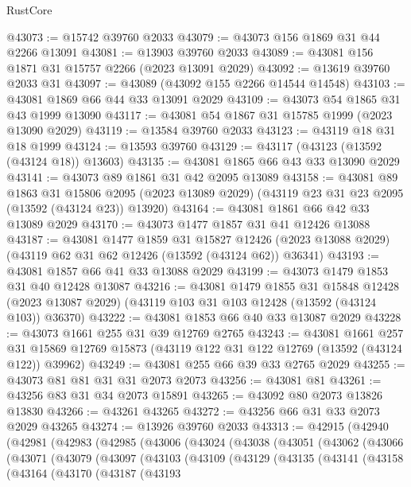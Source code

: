 \begin{lexlean}{RustCore}
\begin{coremodule}
@43073 := @15742 @39760 @2033
@43079 := @43073 @156 @1869 @31 @44 @2266 @13091
@43081 := @13903 @39760 @2033
@43089 := @43081 @156 @1871 @31 @15757 @2266 (@2023 @13091 @2029)
@43092 := @13619 @39760 @2033 @31
@43097 := @43089 (@43092 @155 @2266 @14544 @14548)
@43103 := @43081 @1869 @66 @44 @33 @13091 @2029
@43109 := @43073 @54 @1865 @31 @43 @1999 @13090
@43117 := @43081 @54 @1867 @31 @15785 @1999 (@2023 @13090 @2029)
@43119 := @13584 @39760 @2033
@43123 := @43119 @18 @31 @18 @1999
@43124 := @13593 @39760
@43129 := @43117 (@43123 (@13592 (@43124 @18)) @13603)
@43135 := @43081 @1865 @66 @43 @33 @13090 @2029
@43141 := @43073 @89 @1861 @31 @42 @2095 @13089
@43158 := @43081
    @89
    @1863
    @31
    @15806
    @2095
    (@2023 @13089 @2029)
    (@43119 @23 @31 @23 @2095 (@13592 (@43124 @23)) @13920)
@43164 := @43081 @1861 @66 @42 @33 @13089 @2029
@43170 := @43073 @1477 @1857 @31 @41 @12426 @13088
@43187 := @43081
    @1477
    @1859
    @31
    @15827
    @12426
    (@2023 @13088 @2029)
    (@43119 @62 @31 @62 @12426 (@13592 (@43124 @62)) @36341)
@43193 := @43081 @1857 @66 @41 @33 @13088 @2029
@43199 := @43073 @1479 @1853 @31 @40 @12428 @13087
@43216 := @43081
    @1479
    @1855
    @31
    @15848
    @12428
    (@2023 @13087 @2029)
    (@43119 @103 @31 @103 @12428 (@13592 (@43124 @103)) @36370)
@43222 := @43081 @1853 @66 @40 @33 @13087 @2029
@43228 := @43073 @1661 @255 @31 @39 @12769 @2765
@43243 := @43081
    @1661
    @257
    @31
    @15869
    @12769
    @15873
    (@43119 @122 @31 @122 @12769 (@13592 (@43124 @122)) @39962)
@43249 := @43081 @255 @66 @39 @33 @2765 @2029
@43255 := @43073 @81 @81 @31 @31 @2073 @2073
@43256 := @43081 @81
@43261 := @43256 @83 @31 @34 @2073 @15891
@43265 := @43092 @80 @2073 @13826 @13830
@43266 := @43261 @43265
@43272 := @43256 @66 @31 @33 @2073 @2029 @43265
@43274 := @13926 @39760 @2033
@43313 := @42915
    (@42940
      (@42981
        (@42983
          (@42985
            (@43006
              (@43024
                (@43038
                  (@43051
                    (@43062
                      (@43066
                        (@43071
                          (@43079
                            (@43097
                              (@43103
                                (@43109
                                  (@43129
                                    (@43135
                                      (@43141
                                        (@43158
                                          (@43164
                                            (@43170
                                              (@43187
                                                (@43193

\end{coremodule}
\end{lexlean}
